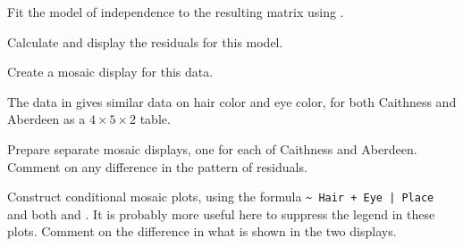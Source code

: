 \documentclass[10pt]{report}\usepackage[]{graphicx}\usepackage[]{color}
\begin{document}
\begin{Exercises}
\begin{enumerate*}
    \item Fit the model of independence to the resulting matrix using .
    \begin{ans}
    \end{ans}
    
    
    \item Calculate and display the residuals for this model.
    \begin{ans}
    \end{ans}
    
    \item Create a mosaic display for this data.
    \begin{ans}
    \end{ans}
    
  \end{enumerate*}
  

  \exercise The  data in  gives similar data on hair color and eye color, for both
  Caithness and Aberdeen as a $4 \times 5 \times 2$ table.
  \begin{enumerate*}
    \item Prepare separate mosaic displays, one for each of Caithness and Aberdeen.  Comment on any difference in
    the pattern of residuals.
    \begin{ans}
    \end{ans}
    
    \item Construct conditional mosaic plots, using the formula
      \verb/~ Hair + Eye | Place/ and both  and
    . It is probably more useful here to suppress the legend in these plots.  Comment on the
    difference in what is shown in the two displays.
    \begin{ans}
    \end{ans}
    
  \end{enumerate*}
  


\end{Exercises}
\end{document}
